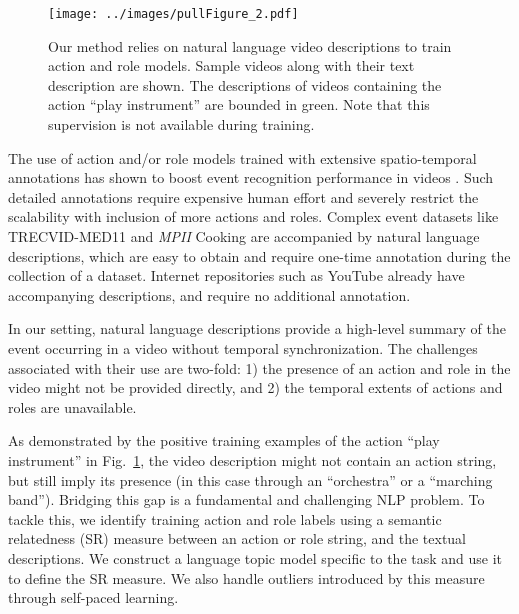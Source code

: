 \documentclass[10pt,twocolumn,letterpaper]{article}
\begin{document}
\begin{figure}[ht!]
\centering
   \texttt{[image: ../images/pullFigure\_2.pdf]}
      \caption{Our method relies on natural language video descriptions to
      train action and role models. Sample videos along with their text
      description are shown. The descriptions of videos containing the action
      ``play instrument'' are bounded in green.
      Note that this supervision is not available during training.}
\label{fig:pull_figure}
\end{figure}

The use of action and/or role models trained with extensive spatio-temporal
annotations has shown to boost event recognition performance in videos
\cite{Izadinia_ECCV12, Lan_CVPR12}. Such detailed annotations require expensive
human effort and severely restrict the scalability with inclusion of more
actions and roles.
Complex event datasets like TRECVID-MED11 \cite{MED11} and \textit{MPII} Cooking
\cite{Regneri_TACL13} are accompanied by natural language descriptions,
which are easy to obtain and require one-time annotation during the
collection of a dataset.
Internet repositories such as YouTube already have accompanying descriptions,
and require no additional annotation.

In our setting,
natural language descriptions provide a high-level summary of the event
occurring in a video without temporal synchronization. The
challenges associated with their use are two-fold: 1) the presence of an action
and role in the video might not be provided directly, and 2) the temporal extents
of actions and roles are unavailable.

As demonstrated by the positive training examples of the action
``play instrument'' in Fig.~\ref{fig:pull_figure}, the video description might
not contain an action string, but still imply its presence (in this
case through an ``orchestra'' or a ``marching band'').
Bridging this gap is a fundamental and challenging NLP problem.
To tackle this, we identify training action and role labels using a semantic
relatedness (SR) measure between an action or role string, and the textual
descriptions. We construct a language topic model specific to the task and use it to
define the SR measure. We also handle outliers introduced by this measure
through self-paced learning.
\end{document}
